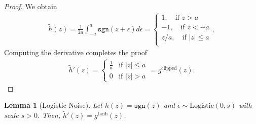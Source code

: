 \documentclass[lettersize,journal]{IEEEtran}
\newtheorem{lemma}{Lemma}
\begin{document}
\begin{proof}
We obtain 
\begin{align}
    \tilde{h}(z) =\frac{1}{2a} \int_{-a}^{a} \texttt{sgn}(z + \epsilon) d\epsilon = \begin{cases}
        1, \quad \text{if } z > a \\ 
        -1, \quad \text{if } z < -a \\ 
        z/a, \quad \text{if } |z| \le a \\ 
    \end{cases},
\end{align}
Computing the derivative completes the proof
\begin{align}
    \tilde{h}'(z) = 
    \begin{cases} 
        \frac{1}{a} & \text{if } |z| \le a \\ 
        0 & \text{if } |z| > a 
    \end{cases} 
    = g^\text{clipped}(z).
\end{align}
\end{proof}

\begin{lemma}[Logistic Noise]
Let $h(z) = \texttt{sgn}(z)$ and  $\epsilon \sim \text{Logistic}(0, s)$ with scale $s > 0$. Then, $\tilde{h}'(z)=g^\text{tanh}(z)$.
\end{lemma}
\end{document}
